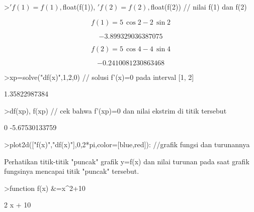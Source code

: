 \documentclass[a4paper,10pt]{article}
\begin{document}
\begin{eulernotebook}
\begin{eulercomment}
\begin{eulercomment}
\begin{eulercomment}
\begin{eulercomment}
\begin{euleroutput}
\end{euleroutput}
\begin{eulerprompt}
>$'f(1)=f(1), $float(f(1)), $'f(2)=f(2), $float(f(2)) // nilai f(1) dan f(2)
\end{eulerprompt}
\begin{eulerformula}
\[
f\left(1\right)=5\,\cos 2-2\,\sin 2
\]
\end{eulerformula}
\begin{eulerformula}
\[
-3.899329036387075
\]
\end{eulerformula}
\begin{eulerformula}
\[
f\left(2\right)=5\,\cos 4-4\,\sin 4
\]
\end{eulerformula}
\begin{eulerformula}
\[
-0.2410081230863468
\]
\end{eulerformula}
\begin{eulerprompt}
>xp=solve("df(x)",1,2,0) // solusi f'(x)=0 pada interval [1, 2]
\end{eulerprompt}
\begin{euleroutput}
  1.35822987384
\end{euleroutput}
\begin{eulerprompt}
>df(xp), f(xp) // cek bahwa f'(xp)=0 dan nilai ekstrim di titik tersebut
\end{eulerprompt}
\begin{euleroutput}
  0
  -5.67530133759
\end{euleroutput}
\begin{eulerprompt}
>plot2d(["f(x)","df(x)"],0,2*pi,color=[blue,red]): //grafik fungsi dan turunannya
\end{eulerprompt}
\begin{eulercomment}
Perhatikan titik-titik "puncak" grafik y=f(x) dan nilai turunan pada saat grafik fungsinya mencapai titik "puncak" tersebut.
\end{eulercomment}
\begin{eulerprompt}
>function f(x) &=x^2+10 
\end{eulerprompt}
\begin{euleroutput}
  
                                  2
                                 x  + 10
  

\end{euleroutput}
\end{eulercomment}
\end{eulercomment}
\end{eulercomment}
\end{eulercomment}
\end{eulernotebook}
\end{document}
